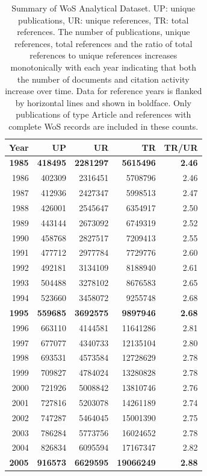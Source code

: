 \documentclass[NETN]{stjour}
\begin{document}
\begin{table}[ht]
\caption{Summary of WoS Analytical Dataset. UP: unique publications, UR: unique references, TR: total references. The number of publications, unique references, total references and the ratio of total references to unique references increases monotonically with each year indicating that both the number of documents and citation activity increase over time. Data for reference years is flanked by horizontal lines and shown in boldface. Only publications of type Article and references with complete WoS records are included in these counts.}
\label{tab:label}
\centering
\begin{tabular}{|rrrrr|}
  \hline
Year & UP & UR & TR & TR/UR \\ 
  \hline
\textbf{1985} & \textbf{418495} & \textbf{2281297} & \textbf{5615496} & \textbf{2.46} \\ 
\hline
1986 & 402309 & 2316451 & 5708796 & 2.46 \\ 
1987 & 412936 & 2427347 & 5998513 & 2.47 \\ 
1988 & 426001 & 2545647 & 6354917 & 2.50 \\ 
1989 & 443144 & 2673092 & 6749319 & 2.52 \\ 
1990 & 458768 & 2827517 & 7209413 & 2.55 \\ 
1991 & 477712 & 2977784 & 7729776 & 2.60 \\ 
1992 & 492181 & 3134109 & 8188940 & 2.61 \\ 
1993 & 504488 & 3278102 & 8676583 & 2.65 \\ 
1994 & 523660 & 3458072 & 9255748 & 2.68 \\ 
 \hline
\textbf{1995} & \textbf{559685} & \textbf{3692575} & \textbf{9897946} & \textbf{2.68} \\ 
\hline
1996 & 663110 & 4144581 & 11641286 & 2.81 \\ 
1997 & 677077 & 4340733 & 12135104 & 2.80 \\ 
1998 & 693531 & 4573584 & 12728629 & 2.78 \\ 
1999 & 709827 & 4784024 & 13280828 & 2.78 \\ 
 2000 & 721926 & 5008842 & 13810746 & 2.76 \\ 
 2001 & 727816 & 5203078 & 14261189 & 2.74 \\ 
 2002 & 747287 & 5464045 & 15001390 & 2.75 \\ 
 2003 & 786284 & 5773756 & 16024652 & 2.78 \\ 
 2004 & 826834 & 6095594 & 17167347 & 2.82 \\ 
 \hline
\textbf{2005} & \textbf{916573} & \textbf{6629595} & \textbf{19066249} & \textbf{2.88} \\ 
 \hline
\end{tabular}
\end{table}
\end{document}
